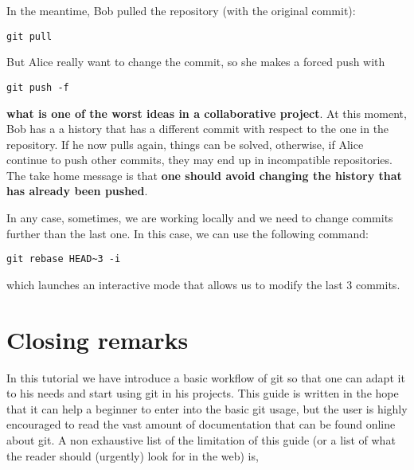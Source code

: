 \documentclass[a4paper,10pt]{article}
\begin{document}
In the meantime, Bob pulled the repository (with the original commit):

\begin{lstlisting}[style=Bob]
 git pull
\end{lstlisting}

But Alice really want to change the commit, so she makes a forced push with

\begin{lstlisting}[style=Alice]
 git push -f
\end{lstlisting}
\textbf{what is one of the worst ideas in a collaborative project}. At this moment, Bob has a a history that has a different commit with respect to the one in the repository. If he now pulls again, things can be solved, otherwise, if Alice continue to push other commits, they may end up in incompatible repositories. The take home message is that \textbf{one should avoid changing the history that has already been pushed}.

In any case, sometimes, we are working locally and we need to change commits further than the last one. In this case, we can use the following command:

\begin{lstlisting}[style=Alice]
 git rebase HEAD~3 -i
\end{lstlisting}
which launches an interactive mode that allows us to modify the last 3 commits. 

\clearpage

\section{Closing remarks}

In this tutorial we have introduce a basic workflow of git so that one can adapt it to his needs and start using git in his projects. This guide is written in the hope that it can help a beginner to enter into the basic git usage, but the user is highly encouraged to read the vast amount of documentation that can be found online about git. A non exhaustive list of the limitation of this guide (or a list of what the reader should (urgently) look for in the web) is,
\end{document}
